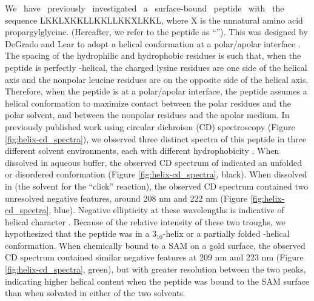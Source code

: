 We~ have~ previously~ investigated~ a~ surface-bound~ peptide~ with~ the~ sequence LKKLXKKLLKKLLKKXLKKL, where X is the unnatural amino acid propargylglycine. 
(Hereafter, we refer to the peptide as ``\pep{}''). 
This was designed by DeGrado and Lear to adopt a helical conformation at a polar/apolar interface \cite{DeGrado1985}.   
The spacing of the hydrophilic and hydrophobic residues is such that, when the peptide is perfectly \textalpha{}-helical, the charged lysine residues are one side of the helical axis and the nonpolar leucine residues are on the opposite side of the helical axis. 
Therefore, when the peptide is at a polar/apolar interface, the peptide assumes a helical conformation to maximize contact between the polar residues and the polar solvent, and between the nonpolar residues and the apolar medium\cite{DeGrado1985}. 
In previously published work using circular dichroism (CD) spectroscopy (Figure \ref{fig:helix-cd_spectra}), we observed three distinct spectra of this peptide in three different solvent environments, each with different hydrophobicity \cite{Gallardo2012}.   
When dissolved in aqueous buffer, the observed CD spectrum of \pep{} indicated an unfolded or disordered conformation (Figure \ref{fig:helix-cd_spectra}, black). 
When dissolved in \tbawat{} (the solvent for the ``click'' reaction), the observed CD spectrum contained two unresolved negative features, around 208 nm and 222 nm (Figure \ref{fig:helix-cd_spectra}, blue). 
Negative ellipticity at these wavelengths is indicative of helical character \cite{Holzwarth1965, Woody1967, Johnson1988, Berova2000circular, Kelly2005}.
Because of the relative intensity of these two troughs, we hypothesized that the peptide was in a $3_{10}$-helix or a partially folded \textalpha{}-helical conformation. 
When chemically bound to a SAM on a gold surface, the observed CD spectrum contained similar negative features at 209 nm and 223 nm (Figure \ref{fig:helix-cd_spectra}, green), but with greater resolution between the two peaks, indicating higher helical content when the peptide was bound to the SAM surface than when solvated in either of the two solvents. 

